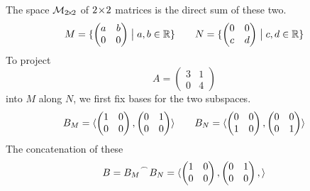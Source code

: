\begin{example} \label{ex:OrthProjOne}
The space \( \mathcal{M}_{2 \! \times \! 2} \) of $2 \! \times \! 2$ matrices is the
direct sum of these two.
\begin{equation*}
   M=\mbox{$\{\begin{pmatrix}
              a  &b  \\
              0  &0
            \end{pmatrix} \bigm| a,b\in\mathbb{R} \}$}
  \qquad
   N=\mbox{$\{\begin{pmatrix}
              0  &0  \\
              c  &d
            \end{pmatrix} \bigm| c,d\in\mathbb{R} \}$}
\end{equation*}
To project
\begin{equation*}
  A=\begin{pmatrix}
          3  &1  \\
          0  &4
  \end{pmatrix}
\end{equation*}
into $M$ along $N$, we first fix bases for the two subspaces.
\begin{equation*}
  B_{M}=\langle
    \begin{pmatrix}
      1  &0  \\
      0  &0      
    \end{pmatrix},
    \begin{pmatrix}
      0  &1  \\
      0  &0
    \end{pmatrix}
                   \rangle
  \qquad
  B_{N}=\langle
    \begin{pmatrix}
      0  &0  \\
      1  &0      
    \end{pmatrix},
    \begin{pmatrix}
      0  &0  \\
      0  &1
    \end{pmatrix}
                   \rangle
\end{equation*}
The concatenation of these
\begin{equation*}
  B=\cat{B_{M}}{B_{N}}=\sequence{
    \begin{pmatrix}
      1  &0  \\
      0  &0      
    \end{pmatrix},
    \begin{pmatrix}
      0  &1  \\
      0  &0
    \end{pmatrix},
}
\end{equation*}
\end{example}
